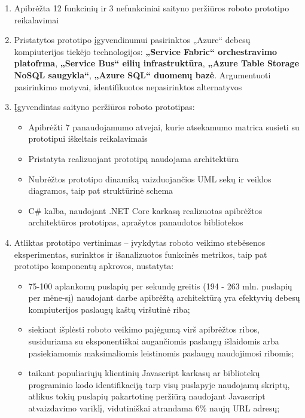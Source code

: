 \begin{enumerate}
    
    \item Apibrėžta 12 funkcinių ir 3 nefunkciniai saityno peržiūros roboto prototipo reikalavimai
    
    
    \item Pristatytos prototipo įgyvendinumui pasirinktos „Azure“ debesų kompiuterijos tiekėjo technologijos: \textbf{„Service Fabric“ orchestravimo platofrma}, \textbf{„Service Bus“ eilių infrastruktūra}, \textbf{„Azure Table Storage NoSQL saugykla“}, \textbf{„Azure SQL“ duomenų bazė}. Argumentuoti pasirinkimo motyvai, identifikuotos nepasirinktos alternatyvos
    
    \item Įgyvendintas saityno peržiūros roboto prototipas:
    \begin{itemize}
        \item Apibrėžti 7 panaudojamumo atvejai, kurie atsekamumo matrica susieti su prototipui iškeltais reikalavimais
        \item Pristatyta realizuojant prototipą naudojama architektūra
        \item Nubrėžtos prototipo dinamiką vaizduojančios UML sekų ir veiklos diagramos, taip pat struktūrinė schema
        \item C\# kalba, naudojant .NET Core karkasą realizuotas apibrėžtos architektūros prototipas, aprašytos panaudotos bibliotekos
    \end{itemize}
    
    \pagebreak
    
    \item Atliktas prototipo vertinimas -- įvykdytas roboto veikimo stebėsenos eksperimentas, surinktos ir išanalizuotos funkcinės metrikos, taip pat prototipo komponentų apkrovos, nustatyta:
    \begin{itemize}
        \item 75-100 aplankomų puslapių per sekundę greitis (194 - 263 mln. puslapių per mėne-sį) naudojant darbe apibrėžtą architektūrą yra efektyvių debesų kompiuterijos paslaugų kaštų viršutinė riba;
        \item siekiant išplėsti roboto veikimo pajėgumą virš apibrėžtos ribos, susiduriama su eksponentiškai augančiomis paslaugų išlaidomis arba pasiekiamomis maksimaliomis leistinomis paslaugų naudojimosi ribomis;
        \item taikant populiariųjų klientinių Javascript karkasų ar bibliotekų programinio kodo identifikaciją tarp visų puslapyje naudojamų skriptų, atlikus tokių puslapių pakartotinę peržiūrą naudojant Javascript atvaizdavimo variklį, vidutiniškai atrandama 6\% naujų URL adresų;
    \end{itemize}
\end{enumerate}